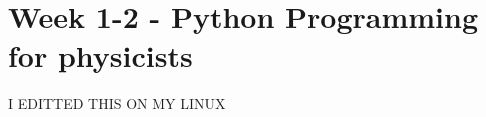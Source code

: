\documentclass[../main.tex]{subfiles}
\begin{document}
\section{Week 1-2 - Python Programming for physicists}

I EDITTED THIS ON MY LINUX
\end{document}

